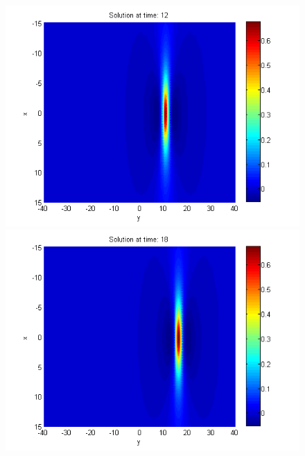\documentclass{article}
\begin{document}
\begin{figure}[ht]
\begin{minipage}[b]{0.30\linewidth}
		 \includegraphics[width=\linewidth]{../amitans/figures/solution_128x90_bt1_c090_T12.png}
	\end{minipage}
	\begin{minipage}[b]{0.30\linewidth}
		\includegraphics[width=\linewidth]{../amitans/figures/solution_128x90_bt1_c090_T18.png}
	\end{minipage}	
	\begin{minipage}[b]{0.30\linewidth}

\end{minipage}
\end{figure}
\end{document}
